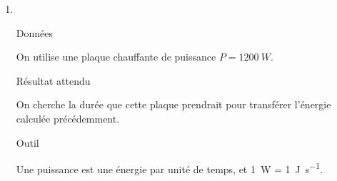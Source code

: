 \documentclass[../main/main.tex]{subfiles}
\begin{document}
\begin{enumerate}
\begin{tcbraster}[raster columns=2, raster equal height=rows]
\begin{tcolorbox}[blankest, raster multicolumn=1, space to=\myspace]
\begin{tcbraster}[raster columns=1]
\begin{NCrapp}[]{Outil}
				      \end{NCrapp}
			      \end{tcbraster}
		      \end{tcolorbox}
	      \end{tcbraster}
	      \begin{NCexem}[]{Application}
		      L'énergie à apporter $Q$ se déduit de la dimension de la capacité
		      thermique massique~: $[c] = [Q]\rm\cdot M^{-1}\cdot \Theta^{-1}$. En appelant
		      $m$ la masse du volume d'eau, par cette analyse dimensionnelle on a
		      \[\boxed{Q = mc\Delta T}\]
		      On a donc
		      \[Q = \SI{3.3e5}{J}\quad\text{avec}\quad \left\{
			      \begin{array}{rcl}
				      m        & = & \SI{1}{kg}                    \\
				      c        & = & \SI{4.18}{J.g^{-1}.K^{-1}}    \\
				      c        & = & \SI{4.18e3}{J.kg^{-1}.K^{-1}} \\
				      \Delta T & = & \SI{80}{K}
			      \end{array}
			      \right.\]
		      et pour utiliser le coût en euros, on la converti en \si{kWh}~:
		      \[Q = \SI{9.3e-2}{kWh} = \SI{1.5e-2}{\EUR}\]
	      \end{NCexem}
	\item ~
	      \begin{tcbraster}[raster columns=2, raster equal height=rows]
		      \begin{tcolorbox}[blankest, raster multicolumn=1, space to=\myspace]
			      \begin{tcbraster}[raster columns=1]
				      \begin{NCdefi}[]{Données}

					      On utilise une plaque chauffante de puissance $P =
						      \SI{1200}{W}$.

				      \end{NCdefi}
				      \begin{NCprop}[]{Résultat attendu}

					      On cherche la durée que cette plaque prendrait pour
					      transférer l'énergie calculée précédemment.

				      \end{NCprop}
				      \begin{NCrapp}[]{Outil}

					      Une puissance est une énergie par unité de temps, et
					      \SI{1}{W} = \SI{1}{J.s^{-1}}.


\end{NCrapp}
\end{tcbraster}
\end{tcolorbox}
\end{tcbraster}
\end{enumerate}
\end{document}
